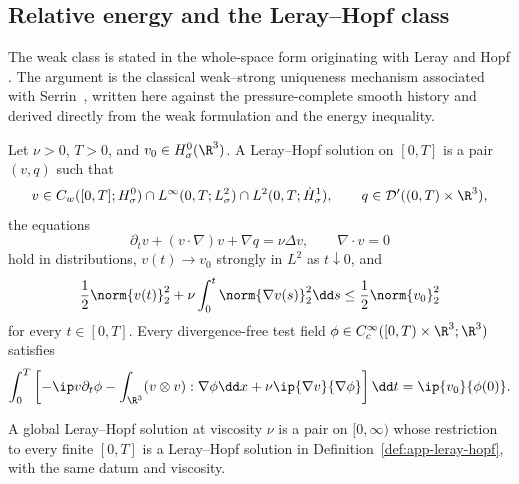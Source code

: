 \subsection{Relative energy and the Leray–Hopf class}

The weak class is stated in the whole-space form originating with Leray and
Hopf \cite{Leray1934,Hopf1951}.  The argument is the classical weak--strong
uniqueness mechanism associated with Serrin~\cite{Serrin1962}, written here
against the pressure-complete smooth history and derived directly from the
weak formulation and the energy inequality.

\begin{definition}
\label{def:app-leray-hopf}
Let \(\nu>0\), \(T>0\), and \(v_0\in H^0_\sigma(\R^3)\).  A Leray--Hopf solution on
\([0,T]\) is a pair \((v,q)\) such that
\[
 v\in C_w([0,T];H^0_\sigma)
 \cap L^\infty(0,T;L^2_\sigma)
 \cap L^2(0,T;\dot H^1_\sigma),
 \qquad
 q\in\mathcal D'((0,T)\times\R^3),
\]
the equations
\[
 \partial_tv+(v\cdot\nabla)v+\nabla q=\nu\Delta v,
 \qquad
 \nabla\cdot v=0
\]
hold in distributions, \(v(t)\to v_0\) strongly in \(L^2\) as
\(t\downarrow0\), and
\begin{equation}
 \frac12\norm{v(t)}_2^2
 +\nu\int_0^t\norm{\nabla v(s)}_2^2\dd s
 \le\frac12\norm{v_0}_2^2
 \label{eq:app-leray-energy}
\end{equation}
for every \(t\in[0,T]\).  Every divergence-free test field
\(\phi\in C_c^\infty([0,T)\times\R^3;\R^3)\) satisfies
\begin{equation}
 \int_0^T\left[
 -\ip v{\partial_t\phi}
 -\int_{\R^3}(v\otimes v):\nabla\phi\dd x
 +\nu\ip{\nabla v}{\nabla\phi}
 \right]\dd t
 =\ip{v_0}{\phi(0)}.
 \label{eq:app-leray-weak-form}
\end{equation}
\end{definition}

A global Leray--Hopf solution at viscosity \(\nu\) is a pair on
\([0,\infty)\) whose restriction to every finite \([0,T]\) is a
Leray--Hopf solution in Definition~\ref{def:app-leray-hopf}, with the same
datum and viscosity.

